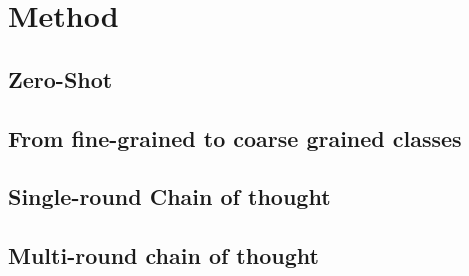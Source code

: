 \chapter{Method}

\section{Zero-Shot}

\section{From fine-grained to coarse grained classes}

\section{Single-round Chain of thought}


\section{Multi-round chain of thought}